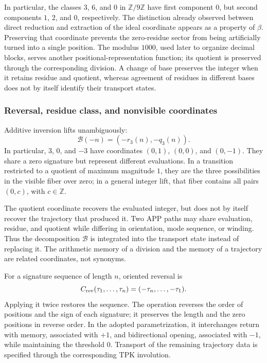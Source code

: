 In particular, the classes \(3\), \(6\), and \(0\) in
\(\mathbb Z/9\mathbb Z\) have first component \(0\), but second
components \(1\), \(2\), and \(0\), respectively. The distinction already observed
between direct reduction and extraction of the ideal coordinate appears
as a property of \(\beta\). Preserving that coordinate prevents the
zero-residue sector from being artificially turned into a single position.
The modulus \(1000\), used later to organize decimal blocks,
serves another positional-representation function; its quotient is preserved
through the corresponding division. A change of base preserves the integer
when it retains residue and quotient, whereas agreement of residues
in different bases does not by itself identify their transport states.

\subsubsection{Reversal, residue class, and nonvisible coordinates}
\label{trit-ampl-inversion}

Additive inversion lifts unambiguously:
\[
 \mathcal B(-n)=(-r_3(n),-q_3(n)).
\]
In particular, \(3\), \(0\), and \(-3\) have coordinates
\((0,1)\), \((0,0)\), and \((0,-1)\). They share a zero signature but represent
different evaluations. In a transition restricted to a quotient of
maximum magnitude \(1\), they are the three possibilities in the visible fiber over
zero; in a general integer lift, that fiber contains all pairs
\((0,c)\), with \(c\in\mathbb Z\).

The quotient coordinate recovers the evaluated integer, but does not by
itself recover the trajectory that produced it. Two APP paths may share
evaluation, residue, and quotient while differing in orientation, mode sequence, or
winding. Thus the decomposition \(\mathcal B\) is integrated into the
transport state instead of replacing it. The arithmetic memory of a
division and the memory of a trajectory are related coordinates, not
synonyms.

For a signature sequence of length \(n\), oriented reversal is
\[
 C_{\rm rev}(\tau_1,\ldots,\tau_n)
   =(-\tau_n,\ldots,-\tau_1).
\]
Applying it twice restores the sequence. The operation reverses the order of
positions and the sign of each signature; it preserves the length and the
zero positions in reverse order. In the adopted parametrization,
it interchanges return with memory, associated with \(+1\), and bidirectional
opening, associated with \(-1\), while maintaining the threshold \(0\). Transport
of the remaining trajectory data is specified through the
corresponding TPK involution.

